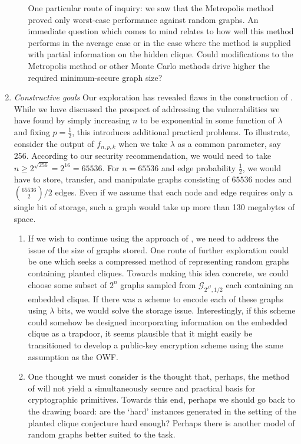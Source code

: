 \documentclass{article}
\theoremstyle{definition}
\begin{document}
\begin{enumerate}
\begin{enumerate}
{One particular route of inquiry: we saw that the Metropolis method proved only worst-case performance against 
random graphs.  An immediate question which comes to mind relates to how well this 
method performs in the average case or in the case where the method is supplied with partial 
information on the hidden clique.  Could modifications to the Metropolis method or 
other Monte Carlo methods drive higher the required minimum-secure graph size?
}
\end{enumerate}
\item{\textit{Constructive goals } Our exploration has revealed flaws in the construction of 
\cite{HidingCliques}.  While we have discussed the prospect of addressing the vulnerabilities 
we have found by simply increasing $n$ to be exponential in some function of $\lambda$ 
and fixing $p=\frac{1}{2}$, this introduces additional practical problems.  To illustrate, 
consider the output of $f_{n,p,k}$ when we take $\lambda$ as a common parameter, say 256.
According to our security recommendation, we would need to take $n\geq2^{\sqrt{256}} = 2^{16} = 65536$.
For $n=65536$ and edge probability $\frac{1}{2}$, we would have to store, transfer, and manipulate
graphs consisting of $65536$ nodes and $\binom{65536}{2}/2$ edges.  Even if we assume that 
each node and edge requires only a single bit of storage, such a graph would take up more than 130 megabytes of space.}
\begin{enumerate}
\item{If we wish to continue using the approach of \cite{HidingCliques}, we need to 
address the issue of the size of graphs stored.  One route of further exploration could be 
one which seeks a compressed method of representing random graphs containing planted cliques.
Towards making this idea concrete, we could choose some subset of $2^n$ graphs sampled from 
$\mathcal{G}_{2^{\lambda^q},1/2}$ each containing an embedded clique.  If there was a scheme to 
encode each of these graphs using $\lambda$ bits, we would solve the storage issue.  
Interestingly, if this scheme could somehow be designed incorporating 
information on the embedded clique as a 
trapdoor, it seems plausible that it might easily be transitioned to develop a public-key encryption 
scheme using the same assumption as the OWF.}
\item{One thought we must consider is the thought that, perhaps, the method of \cite{HidingCliques} 
will not yield a simultaneously secure and practical basis for cryptographic primitives.  Towards 
this end, perhaps we should go back to the drawing board: are the `hard' instances generated 
in the setting of the planted clique conjecture hard enough?  Perhaps there is another model of 
random graphs better suited to the task.}
\end{enumerate}
\end{enumerate} 
\end{document}
